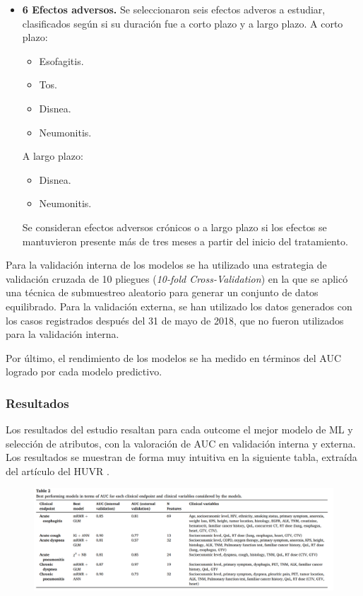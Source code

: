 \begin{itemize}
    \item \textbf{6 Efectos adversos.} Se seleccionaron seis efectos adveros a estudiar, clasificados según si su duración fue a corto plazo y a largo plazo. A corto plazo:
    \begin{itemize}[label={--}]
        \item Esofagitis.
        \item Tos.
        \item Disnea. 
        \item Neumonitis. 
    \end{itemize}
    A largo plazo:
    \begin{itemize}[label={--}]
        \item Disnea. 
        \item Neumonitis. 
    \end{itemize}
    Se consideran efectos adversos crónicos o a largo plazo si los efectos se mantuvieron presente más de tres meses a partir del inicio del tratamiento.
\end{itemize}

Para la validación interna de los modelos se ha utilizado una estrategia de validación cruzada de 10 pliegues (\textit{10-fold Cross-Validation}) en la que se aplicó una técnica de submuestreo aleatorio para generar un conjunto de datos equilibrado. Para la validación externa, se han utilizado los datos generados con los casos registrados después del 31 de mayo de 2018, que no fueron utilizados para la validación interna. 

Por último, el rendimiento de los modelos se ha medido en términos del AUC logrado por cada modelo predictivo.

\subsubsection{Resultados}

   Los resultados del estudio resaltan para cada outcome el mejor modelo de ML y selección de atributos, con la valoración de AUC en validación interna y externa. Los resultados se muestran de forma muy intuitiva en la siguiente tabla, extraída del artículo del HUVR \parencite{nunez2023benchmarking}.

\begin{figure}[H]
    \centering
    \includegraphics[width=1\textwidth]{tables/nune2023table2.png}
    \label{table:nune2023table2}
\end{figure}


